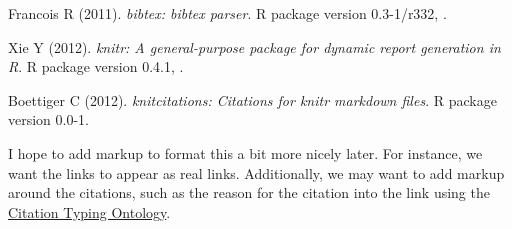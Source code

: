 \documentclass[]{article}
\begin{document}
Francois R (2011). \emph{bibtex: bibtex parser}. R package version
0.3-1/r332, .

Xie Y (2012). \emph{knitr: A general-purpose package for dynamic report
generation in R}. R package version 0.4.1, .

Boettiger C (2012). \emph{knitcitations: Citations for knitr markdown
files}. R package version 0.0-1.

I hope to add markup to format this a bit more nicely later. For
instance, we want the links to appear as real links. Additionally, we
may want to add markup around the citations, such as the reason for the
citation into the link using the
\href{http://speroni.web.cs.unibo.it/cgi-bin/lode/req.py?req=http:/purl.org/spar/cito}{Citation
Typing Ontology}.
\end{document}
